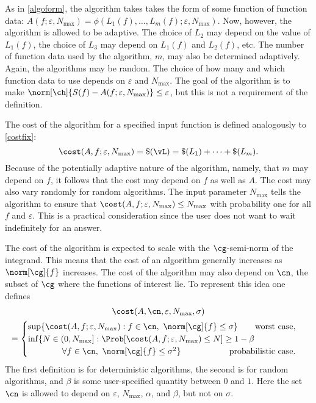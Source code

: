 \documentclass[final]{elsarticle}
\theoremstyle{definition}
\theoremstyle{remark}
\begin{document}
As in \eqref{algoform}, the algorithm takes takes the form of some function of function data: $A(f;\varepsilon,N_{\max}) = \phi\left(L_1(f), \ldots, L_m(f);\varepsilon,N_{\max}\right)$.
Now, however, the algorithm is allowed to be adaptive. The choice of $L_2$ may depend on the value of $L_1(f)$, the choice of $L_3$ may depend on $L_1(f)$ and $L_2(f)$, etc.  The number of function data used by the algorithm, $m$, may also be determined adaptively. Again, the algorithms may be random.  The choice of how many and which function data to use depends on $\varepsilon$ and $N_{\max}$.  The goal of the algorithm is to make $\norm[\ch]{S(f) - A(f;\varepsilon,N_{\max})} \le \varepsilon$, but this is not a requirement of the definition.

The cost of the algorithm for a specified input function is defined analogously to \eqref{costfix}:
\[
\cost(A,f;\varepsilon,N_{\max}) = \$(\vL) = \$(L_1) + \cdots +\$(L_m).
\]
Because of the potentially adaptive nature of the algorithm, namely, that $m$ may depend on $f$, it follows that the cost may depend on $f$ as well as $A$. The cost may also vary randomly for random algorithms.  The input parameter $N_{\max}$ tells the algorithm to ensure that $\cost(A,f;\varepsilon,N_{\max}) \le N_{\max}$ with probability one for all $f$ and $\varepsilon$.  This is a practical consideration since the user does not want to wait indefinitely for an answer.  

The cost of the algorithm is expected to scale with the $\cg$-semi-norm of the integrand.  This means that the cost of an algorithm generally increases as $\norm[\cg]{f}$ increases.  The cost of the algorithm may also depend on $\cn$, the subset of $\cg$ where the functions of interest lie.  To represent this idea one defines
\begin{multline*}
\cost(A,\cn,\varepsilon,N_{\max},\sigma) \\
= \begin{cases} \displaystyle \sup \{ \cost(A,f;\varepsilon,N_{\max}) : f \in \cn, \ \norm[\cg]{f} \le \sigma \} \qquad \text{worst case},\\
\displaystyle \inf \{N \in (0,N_{\max}] : \Prob[\cost(A,f;\varepsilon,N_{\max}) \le N] \ge 1 - \beta \\
\qquad \qquad  \forall f \in \cn , \ \norm[\cg]{f} \le \sigma^2\}
\hfill \hfill \text{probabilistic case}.
\end{cases}
\end{multline*}
The first definition is for deterministic algorithms, the second is for random algorithms, and $\beta$ is some user-specified quantity between $0$ and $1$.  Here the set $\cn$ is allowed to depend on $\varepsilon$, $N_{\max}$, $\alpha$, and $\beta$, but not on $\sigma$.
\end{document}
